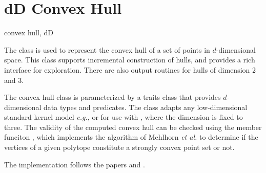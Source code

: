 \section{dD Convex Hull}
\begin{ccPackage}{convex hull, dD}
  
The class  is used to represent the
convex hull of a set of points in $d$-dimensional space.  This class
supports incremental construction of hulls, and provides a rich
interface for exploration. There are also output routines for hulls
of dimension 2 and 3.

The convex hull class is parameterized by a traits class that provides 
$d$-dimensional data types and predicates.  The class 
 adapts any low-dimensional standard kernel 
model \textit{e.g.},  or  for use 
with , where the dimension is fixed to three.
The validity of the computed convex hull can be checked using the
member funciton , which implements the algorithm
of Mehlhorn \textit{et al.}\cite{mnssssu-cgpvg-96} to determine if
the vertices of a given polytope constitute a strongly convex point
set or not.
  
The implementation follows the papers \cite{cms:fourresults-93} and
\cite{BMS:degeneracy-94}.  

\end{ccPackage}

